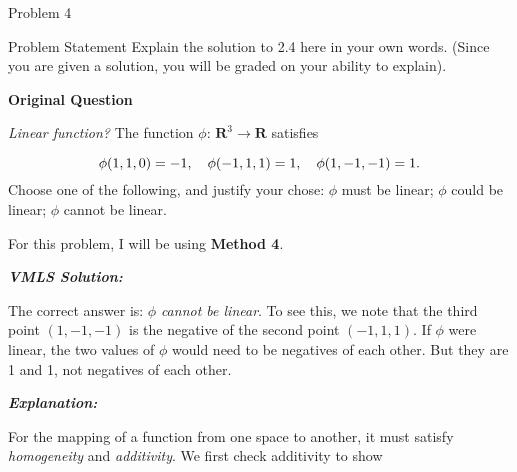 \begin{problem}{Problem 4}
    \begin{statement}{Problem Statement}
        Explain the solution to 2.4 here in your own words. (Since you are given a solution, you will be graded on your ability to explain). \vspace*{1em}

        \textbf{Original Question} \vspace*{1em}

        \textit{Linear function?} The function $\phi$: $\mathbf{R}^{3} \rightarrow \mathbf{R}$ satisfies

        \begin{equation*}
            \phi(1,1,0) = -1, \hspace*{10pt} \phi(-1,1,1) = 1, \hspace*{10pt} \phi(1,-1,-1) = 1.
        \end{equation*}
        Choose one of the following, and justify your chose: $\phi$ must be linear; $\phi$ could be linear; $\phi$ cannot be linear.
    \end{statement}

    \begin{Highlight}[Solution]
        For this problem, I will be using \textbf{Method 4}. \vspace*{1em}

        \textbf{\textit{VMLS Solution:}} \vspace*{1em}

        The correct answer is: $\phi$ \textit{cannot be linear}. To see this, we note that the third point $(1,-1,-1)$ is the negative of the second point $(-1,1,1)$. If $\phi$ were linear,
        the two values of $\phi$ would need to be negatives of each other. But they are 1 and 1, not negatives of each other. \vspace*{1em}

        \textbf{\textit{Explanation:}} \vspace*{1em}

        For the mapping of a function from one space to another, it must satisfy \textit{homogeneity} and \textit{additivity}. We first check additivity to show


\end{Highlight}
\end{problem}
